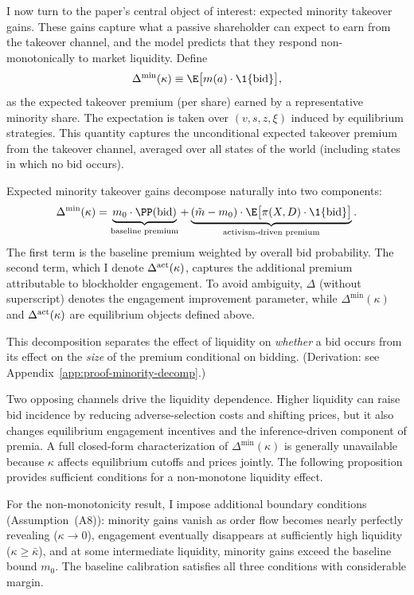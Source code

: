 I now turn to the paper's central object of interest: expected minority takeover gains. These gains capture what a passive shareholder can expect to earn from the takeover channel, and the model predicts that they respond non-monotonically to market liquidity. Define
\begin{equation}
\Delta^{\min}(\kappa) \equiv \E\big[m(a) \cdot \1\{\textup{bid}\}\big],
\label{eq:minority}
\end{equation}
as the expected takeover premium (per share) earned by a representative minority share. The expectation is taken over $(v,s,z,\xi)$ induced by equilibrium strategies. This quantity captures the unconditional expected takeover premium from the takeover channel, averaged over all states of the world (including states in which no bid occurs).

Expected minority takeover gains decompose naturally into two components:
\begin{equation}
\Delta^{\min}(\kappa) = \underbrace{m_0 \cdot \PP(\textup{bid})}_{\text{baseline premium}} + \underbrace{(\tilde{m}-m_0)\cdot \E\big[\pi(X,D)\cdot \1\{\textup{bid}\}\big]}_{\text{activism-driven premium}}.
\label{eq:decomp}
\end{equation}
The first term is the baseline premium weighted by overall bid probability. The second term, which I denote $\Delta^{\textup{act}}(\kappa)$, captures the additional premium attributable to blockholder engagement. To avoid ambiguity, $\Delta$ (without superscript) denotes the engagement improvement parameter, while $\Delta^{\min}(\kappa)$ and $\Delta^{\textup{act}}(\kappa)$ are equilibrium objects defined above.

This decomposition separates the effect of liquidity on \emph{whether} a bid occurs from its effect on the \emph{size} of the premium conditional on bidding. (Derivation: see Appendix~\ref{app:proof-minority-decomp}.)

Two opposing channels drive the liquidity dependence. Higher liquidity can raise bid incidence by reducing adverse-selection costs and shifting prices, but it also changes equilibrium engagement incentives and the inference-driven component of premia. A full closed-form characterization of $\Delta^{\min}(\kappa)$ is generally unavailable because $\kappa$ affects equilibrium cutoffs and prices jointly. The following proposition provides sufficient conditions for a non-monotone liquidity effect.

For the non-monotonicity result, I impose additional boundary conditions (Assumption~\textup{(A8)}): minority gains vanish as order flow becomes nearly perfectly revealing ($\kappa \to 0$), engagement eventually disappears at sufficiently high liquidity ($\kappa \geq \bar{\kappa}$), and at some intermediate liquidity, minority gains exceed the baseline bound $m_0$. The baseline calibration satisfies all three conditions with considerable margin.

